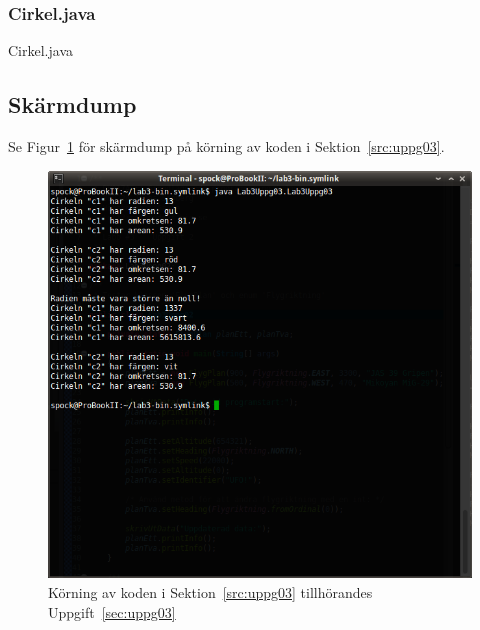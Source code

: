 \subsubsection{Cirkel.java}
\caption{Cirkel.java}
\label{src:cirkel}


\subsection{Skärmdump}
Se Figur~\ref{fig:uppg03-screenshot} för skärmdump på körning av koden i
Sektion~\ref{src:uppg03}.

\begin{figure}[htbp]
\centering
\includegraphics[width=\linewidth]{img/03.png}
\caption{Körning av koden i Sektion~\ref{src:uppg03} tillhörandes Uppgift~\ref{sec:uppg03}}
\label{fig:uppg03-screenshot}
\end{figure}

